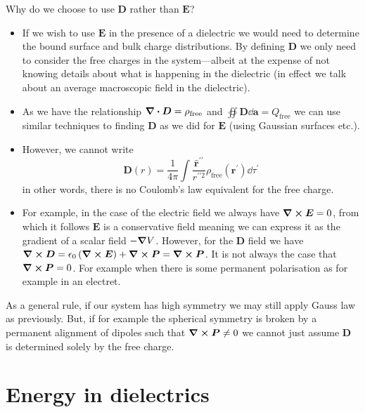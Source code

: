 \documentclass[12pt,chapterprefix=false,dvipsnames]{scrbook}
\theoremstyle{dotless}
\theoremstyle{definition}
\begin{document}
Why do we choose to use $\bm{D}$ rather than
$\bm{E}$?
\begin{itemize}
	\item If we wish to use $\bm{E}$ in the presence of a
	      dielectric we would need to determine the bound surface and bulk
	      charge distributions. By defining $\bm{D}$ we
	      only need to consider the free charges in the system---albeit at
	      the expense of not knowing details about what is happening in
	      the dielectric (in effect we talk about an average macroscopic
	      field in the dielectric).
	\item As we have the relationship $\divergence{\bm{D}} = \rho_{\mathrm{free}}$ and
	      $\oiint\bm{D}\dd{\bm{a}} =
		      Q_{\mathrm{free}}$ we can use similar techniques to finding
	      $\bm{D}$ as we did for $\bm{E}$
	      (using Gaussian surfaces etc.).
	\item However, we cannot write
	      \begin{equation}
		      \bm{D}\left(r\right)
		      =
		      \frac{1}{4\pi}
		      \int\frac{\hat{\bm{r}}^{\prime\prime}}{r^{\prime\prime 2}}
		      \rho_{\mathrm{free}}\left(\bm{r^\prime}\right)
		      \dd{\tau^\prime}
	      \end{equation}
	      in other words, there is no Coulomb's law equivalent for the
	      free charge.
	\item For example, in the case of the electric field we always have
	      $\curl{\bm{E}} = 0$, from which it follows
	      $\bm{E}$ is a conservative field meaning we can
	      express it as the gradient of a scalar field
	      $-\gradient{V}$. However, for the
	      $\bm{D}$ field we have $\curl{\bm{D}} =
		      \epsilon_{0}\left(\curl{\bm{E}}\right) +
		      \curl{\bm{P}} =
		      \curl{\bm{P}}$.
	      It is not always the case that $\curl{\bm{P}} = 0$. For
	      example when there is some permanent polarisation as for example
	      in an electret.
\end{itemize}

As a general rule, if our system has high symmetry we may still
apply Gauss law as previously. But, if for example the spherical
symmetry is broken by a permanent alignment of dipoles such that
$\curl{\bm{P}}\neq 0$ we cannot just assume
$\bm{D}$ is determined solely by the free charge.

\section{Energy in dielectrics}%
\label{sec:energy_in_dielectrics}
\end{document}
